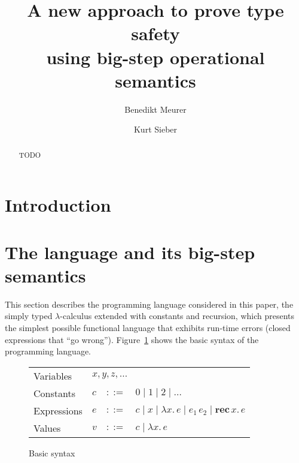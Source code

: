 \documentclass[12pt,a2paper,draft]{article}
\newcommand{\abstr}[2]{\ensuremath{\lambda{#1}.\,{#2}}}
\newcommand{\app}[2]{\ensuremath{{#1}\,{#2}}}
\newcommand{\rec}[2]{\ensuremath{\textbf{rec}\,{#1}.\,{#2}}}
\begin{document}
\title{%
  A new approach to prove type safety\\using big-step operational semantics
}
\author{Benedikt Meurer}
\author{Kurt Sieber}
\date{}
\maketitle
\begin{abstract}
  TODO
\end{abstract}


\section{Introduction}


\section{The language and its big-step semantics}

This section describes the programming language considered in this paper,
the simply typed $\lambda$-calculus extended with constants and recursion, which
presents the simplest possible functional language that exhibits run-time
errors (closed expressions that ``go wrong''). Figure~\ref{figure:Basic_syntax}
shows the basic syntax of the programming language.

\begin{figure}[htb]
  \centering
  \begin{tabular}{llcl}
    Variables   & \multicolumn{3}{l}{$x,y,z,\ldots$} \\
    Constants   & $c$ & $::=$ & $0 \mid 1 \mid 2 \mid \ldots$ \\
    Expressions & $e$ & $::=$ & $c \mid x \mid \abstr{x}{e} \mid \app{e_1}{e_2} \mid \rec{x}{e}$ \\
    Values      & $v$ & $::=$ & $c \mid \abstr{x}{e}$
  \end{tabular}
  \caption{Basic syntax}
  \label{figure:Basic_syntax}
\end{figure}
\end{document}
